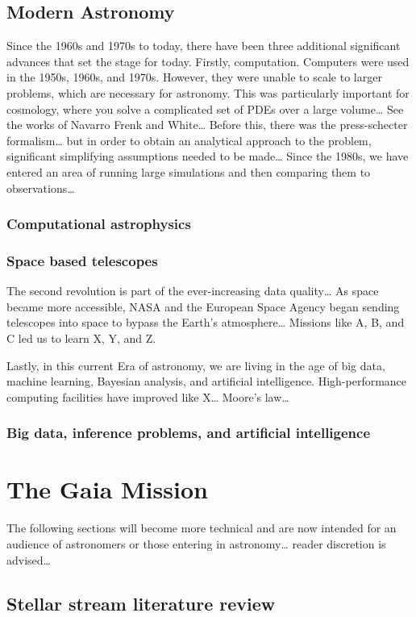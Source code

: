 \subsection{Modern Astronomy}
Since the 1960s and 1970s to today, there have been three additional significant advances that set the stage for today. Firstly, computation. Computers were used in the 1950s, 1960s, and 1970s. However, they were unable to scale to larger problems, which are necessary for astronomy. This was particularly important for cosmology, where you solve a complicated set of PDEs over a large volume… See the works of Navarro Frenk and White… Before this, there was the press-schecter formalism… but in order to obtain an analytical approach to the problem, significant simplifying assumptions needed to be made… Since the 1980s, we have entered an area of running large simulations and then comparing them to observations… 

\subsubsection*{Computational astrophysics}

\subsubsection*{Space based telescopes}

The second revolution is part of the ever-increasing data quality… As space became more accessible, NASA and the European Space Agency began sending telescopes into space to bypass the Earth's atmosphere… Missions like A, B, and C led us to learn X, Y, and Z. 


Lastly, in this current Era of astronomy, we are living in the age of big data, machine learning, Bayesian analysis, and artificial intelligence. High-performance computing facilities have improved like X… Moore's law… 


\subsubsection*{Big data, inference problems, and artificial intelligence }

\section{The Gaia Mission }

The following sections will become more technical and are now intended for an audience of astronomers or those entering in astronomy… reader discretion is advised… 

\subsection{Stellar stream literature review}